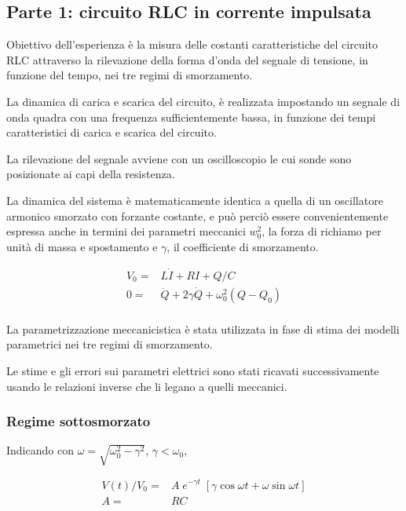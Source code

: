 \subsection{Parte 1: circuito RLC in corrente impulsata}

Obiettivo dell'esperienza è la misura delle costanti caratteristiche del circuito RLC attraverso la rilevazione della forma d'onda del segnale di tensione, in funzione del tempo, nei tre regimi di smorzamento.

La dinamica di carica e scarica del circuito, è realizzata impostando un segnale di onda quadra con una frequenza sufficientemente bassa, in funzione dei tempi caratteristici di carica e scarica del circuito.

La rilevazione del segnale avviene con un oscilloscopio le cui sonde sono posizionate ai capi della resistenza.

La dinamica del sistema è matematicamente identica a quella di un oscillatore armonico smorzato con forzante costante, e può perciò essere convenientemente espressa anche in termini dei parametri meccanici $w_0^2$, la forza di richiamo per unità di massa e spostamento e $\gamma$, il coefficiente di smorzamento.

\begin{align*}
V_0    = & L\dot{I} + RI + Q/C   \\
0      = & \ddot{Q} + 2\gamma \dot{Q} + \omega_0^2(Q-Q_0) \\
\end{align*}

La parametrizzazione meccanicistica è stata utilizzata in fase di stima dei modelli parametrici nei tre regimi di smorzamento. 

Le stime e gli errori sui parametri elettrici sono stati ricavati successivamente usando le relazioni inverse che li legano a quelli meccanici.








\subsubsection{Regime sottosmorzato}

Indicando con 
$\omega = \sqrt{\omega_0^2 - \gamma^2}$, $\gamma < \omega_0$,

\begin{align*}
V(t) / V_{0} =&  A \; e^{-\gamma t} \; [ \gamma \cos\omega t + \omega \sin\omega t ] \\
A =& RC
\end{align*}

